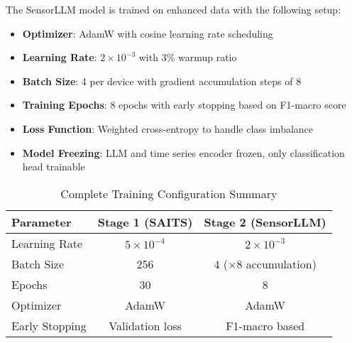 \hspace{2em}The SensorLLM model is trained on enhanced data with the following setup:

\begin{itemize}
    \item \textbf{Optimizer}: AdamW with cosine learning rate scheduling
    \item \textbf{Learning Rate}: $2 \times 10^{-3}$ with 3\% warmup ratio
    \item \textbf{Batch Size}: 4 per device with gradient accumulation steps of 8
    \item \textbf{Training Epochs}: 8 epochs with early stopping based on F1-macro score
    \item \textbf{Loss Function}: Weighted cross-entropy to handle class imbalance
    \item \textbf{Model Freezing}: LLM and time series encoder frozen, only classification head trainable
\end{itemize}

\begin{table}[h]
\centering
\caption{Complete Training Configuration Summary}
\begin{tabular}{|l|c|c|}
\hline
\textbf{Parameter} & \textbf{Stage 1 (SAITS)} & \textbf{Stage 2 (SensorLLM)} \\ \hline
Learning Rate & $5 \times 10^{-4}$ & $2 \times 10^{-3}$ \\ \hline
Batch Size & 256 & 4 ($\times$8 accumulation) \\ \hline
Epochs & 30 & 8 \\ \hline
Optimizer & AdamW & AdamW \\ \hline
Early Stopping & Validation loss & F1-macro based \\ \hline
\end{tabular}
\end{table}

